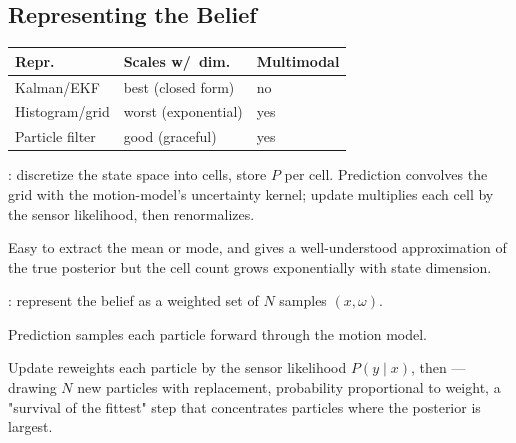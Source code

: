 \subsection{Representing the Belief}
\begin{center}\small
\begin{tabular}{@{}p{2.1cm}p{2.3cm}p{1.7cm}@{}}
\toprule
Repr.\ & Scales w/\ dim.\ & Multimodal \\
\midrule
Kalman/EKF & best (closed form) & no \\
Histogram/grid & worst (exponential) & yes \\
Particle filter & good (graceful) & yes \\
\bottomrule
\end{tabular}
\end{center}

: discretize the state space into cells, store $P$ per cell. Prediction convolves the grid with the motion-model's uncertainty kernel; update multiplies each cell by the sensor likelihood, then renormalizes. 

Easy to extract the mean or mode, and gives a well-understood approximation of the true posterior but the cell count grows exponentially with state dimension.


: represent the belief as a weighted set of $N$ samples $(x,\omega)$. 

Prediction samples each particle forward through the motion model. 

Update reweights each particle by the sensor likelihood $P(y\mid x)$, then  --- drawing $N$ new particles with replacement, probability proportional to weight, a "survival of the fittest" step that concentrates particles where the posterior is largest.

